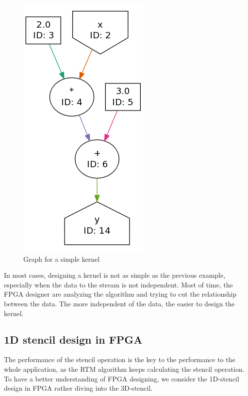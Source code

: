 \begin{figure}
  \centering
  \includegraphics[scale=0.5]{img/SimpleKernel_original.png}
  \caption{Graph for a simple kernel}
  \label{fig:fx}
\end{figure}

In most cases, designing a kernel is not as simple as the previous example,
especially when the data to the stream is not independent. Most of time,
the FPGA designer are analyzing the algorithm and trying to cut the
relationship between the data. The more independent of the data, the easier
to design the kernel.


\subsection{1D stencil design in FPGA} %
\label{sub:1D stencil design in FPGA}



The performance of the stencil operation is the key to the performance to
the whole application, as the RTM algorithm keeps calculating the stencil
operation. To have a better understanding of FPGA designing, we consider
the 1D-stencil design in FPGA rather diving into the 3D-stencil.

